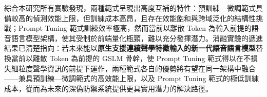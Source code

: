 綜合本研究所有實驗發現，兩種範式呈現出高度互補的特性：預訓練—微調範式具備較高的偵測效能上限，但訓練成本高昂，且存在效能飽和與跨域泛化的結構性挑戰；Prompt Tuning 範式訓練效率極高，然而當前以離散 Token 為輸入前提的語音語言模型架構，使其受制於前端量化瓶頸，難以充分發揮潛力。消融實驗的遞進結果已清楚指向：若未來能以\textbf{原生支援連續聲學特徵輸入的新一代語音語言模型}替換當前以離散 Token 為前提的 GSLM 骨幹，使 Prompt Tuning 範式得以在不損失細粒度聲學資訊的前提下運作，兩種範式各自的優勢將有望在同一架構中融合——兼具預訓練—微調範式的高效能上限，以及 Prompt Tuning 範式的極低訓練成本，從而為未來的深偽防禦系統提供更具實用潛力的解決路徑。
